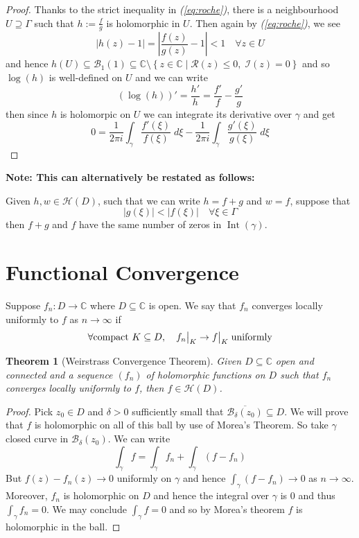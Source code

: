 \documentclass[11pt]{article}
\newcommand{\defeq}{:=}
\newcommand{\abs}[1]{\left|#1\right|}
\DeclareMathOperator{\Int}{\text{Int}}
\newcommand{\relmiddle}[1]{\mathrel{}\middle#1\mathrel{}}
\newcommand{\rmv}{\relmiddle|}
\newcommand\restr[2]{{%
  \left.\kern-\nulldelimiterspace %
  #1 %
  \vphantom{\big|} %
  \right|_{#2} %
  }}
\newcommand{\C}{\mathbb{C}}
\newenvironment{defin}
	{\begin{mdframed}[backgroundcolor=white, roundcorner=5pt, linewidth=1pt]}
	{\end{mdframed}}
\newcommand{\mdf}[1]{{\color{red} #1}}
\newenvironment{note}
	{\begin{mdframed}[backgroundcolor=white, linecolor=red, roundcorner=5pt, linewidth=1pt]\bfseries{Note:}\normalfont}
	{\end{mdframed}}
\newtheorem{theorem}{Theorem}[section]
\begin{document}
\begin{proof}
Thanks to the strict inequality in \textit{(\ref{eq:roche})}, there is a neighbourhood $U\supseteq \Gamma$ such that $h\defeq\frac{f}{g}$ is holomorphic in $U$.
Then again by \textit{(\ref{eq:roche})}, we see
\[
	\abs{h(z)-1}=\abs{\frac{f(z)}{g(z)}-1}<1 \quad \forall z\in U
\]
and hence $h(U)\subseteq \mathcal{B}_1(1) \subseteq \C\setminus\left\{z\in\C \rmv \mathcal{R}(z)\leq 0, \; \mathcal{I}(z)=0\right\}$ and so $\log(h)$ is well-defined on $U$ and we can write
\[
	(\log(h))'=\frac{h'}{h}=\frac{f'}{f}-\frac{g'}{g}
\]
then since $h$ is holomorpic on $U$ we can integrate its derivative over $\gamma$ and get
\[
	0=\frac{1}{2\pi i}\int_\gamma\frac{f'(\xi)}{f(\xi)}\;d\xi - \frac{1}{2\pi i}\int_\gamma\frac{g'(\xi)}{g(\xi)}\;d\xi
\]
\end{proof}

\begin{note}
This can alternatively be restated as follows:

Given $h,w\in\mathcal{H}(D)$, such that we can write $h=f+g$ and $w=f$, suppose that
\[
	\abs{g(\xi)} < \abs{f(\xi)} \quad \forall\xi\in\Gamma
\]
then $f+g$ and $f$ have the same number of zeros in $\Int(\gamma)$.
\end{note}

\section{Functional Convergence}
\begin{defin}
Suppose $f_n:D\to\C$ where $D\subseteq\C$ is open.
We say that $f_n$ \mdf{converges locally uniformly} to $f$ as $n\to\infty$ if
\[
	\forall\text{compact }K\subseteq D, \quad \restr{f_n}{K}\to\restr{f}{K}\;\text{uniformly}
\]
\end{defin}
\begin{theorem}[Weirstrass Convergence Theorem]
Given $D\subseteq\C$ open and connected and a sequence $(f_n)$ of holomorphic functions on $D$ such that $f_n$ converges locally uniformly to $f$, then $f\in\mathcal{H}(D)$.
\end{theorem}

\begin{proof}
Pick $z_0\in D$ and $\delta>0$ sufficiently small that $\overline{\mathcal{B}_\delta(z_0)}\subseteq D$.
We will prove that $f$ is holomorphic on all of this ball by use of Morea's Theorem.
So take $\gamma$ closed curve in $\mathcal{B}_\delta(z_0)$.
We can write
\[
	\int_\gamma f = \int_\gamma f_n + \int_\gamma (f - f_n)
\]
But $f(z)-f_n(z)\to 0$ uniformly on $\gamma$ and hence $\int_\gamma (f-f_n) \to 0$ as $n\to\infty$.
Moreover, $f_n$ is holomorphic on $D$ and hence the integral over $\gamma$ is $0$ and thus $\int_\gamma f_n=0$.
We may conclude $\int_\gamma f=0$ and so by Morea's theorem $f$ is holomorphic in the ball.
\end{proof}
\end{document}
